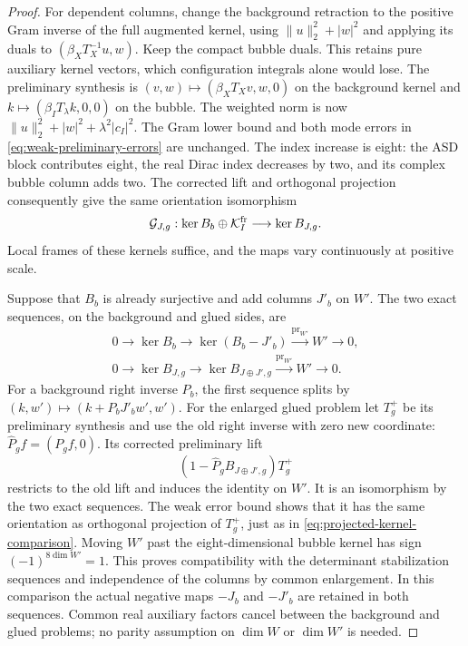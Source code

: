 \documentclass[11pt]{amsart}
\theoremstyle{definition}
\theoremstyle{remark}
\theoremstyle{plain}
\newcommand{\cG}{\mathcal{G}}
\newcommand{\cK}{\mathcal{K}}
\begin{document}
\begin{proof}
For dependent columns, change the background retraction to the
positive Gram inverse of the full augmented kernel, using
$\|u\|_2^2+|w|^2$ and applying its duals to
$(\beta_XT_X^{-1}u,w)$.  Keep the compact bubble duals.  This
retains pure auxiliary kernel vectors, which configuration integrals
alone would lose.  The preliminary synthesis is
$(v,w)\mapsto(\beta_XT_Xv,w,0)$ on the background kernel and
$k\mapsto(\beta_IT_\lambda k,0,0)$ on the bubble.  The weighted
norm is now $\|u\|_2^2+|w|^2+\lambda^2|c_I|^2$.
The Gram lower bound and both mode errors in
\eqref{eq:weak-preliminary-errors} are unchanged.  The index increase
is eight: the ASD block contributes eight, the real Dirac index
decreases by two, and its complex bubble column adds two.
The corrected lift and orthogonal projection consequently give the
same orientation isomorphism
\begin{equation}\label{eq:general-kernel-addition}
 \cG_{J,g}:\ker B_b\oplus\cK_I^{\rm fr}
 \longrightarrow\ker B_{J,g}.
\end{equation}
Local frames of these kernels suffice, and the maps vary continuously
at positive scale.

Suppose that $B_b$ is already surjective and add columns $J'_b$ on
$W'$.  The two exact sequences, on the background and glued sides, are
\begin{equation}\label{eq:orientation-enlargement-sequences}
 \begin{gathered}
 0\longrightarrow\ker B_b\longrightarrow\ker(B_b-J'_b)
 \xrightarrow{\operatorname{pr}_{W'}}W'\longrightarrow0,\\
 0\longrightarrow\ker B_{J,g}\longrightarrow\ker B_{J\oplus J',g}
 \xrightarrow{\operatorname{pr}_{W'}}W'\longrightarrow0.
 \end{gathered}
\end{equation}
For a background right inverse $P_b$, the first sequence splits by
$(k,w')\mapsto(k+P_bJ'_bw',w')$.  For the enlarged glued problem
let $T_g^+$ be its preliminary synthesis and use the old right
inverse with zero new coordinate:
$\widehat P_gf=(P_gf,0)$.  Its corrected preliminary lift
\[
 (1-\widehat P_gB_{J\oplus J',g})T_g^+
\]
restricts to the old lift and induces the identity on $W'$.
It is an isomorphism by the two exact sequences.  The weak error
bound shows that it has the same orientation as orthogonal
projection of $T_g^+$, just as in
\eqref{eq:projected-kernel-comparison}.  Moving $W'$ past the
eight-dimensional bubble kernel has sign $(-1)^{8\dim W'}=1$.
This proves compatibility with the determinant stabilization
sequences and independence of the columns by common enlargement.
In this comparison the actual negative maps $-J_b$ and $-J'_b$ are
retained in both sequences.  Common real auxiliary factors cancel
between the background and glued problems; no parity assumption on
$\dim W$ or $\dim W'$ is needed.


\end{proof}
\end{document}

